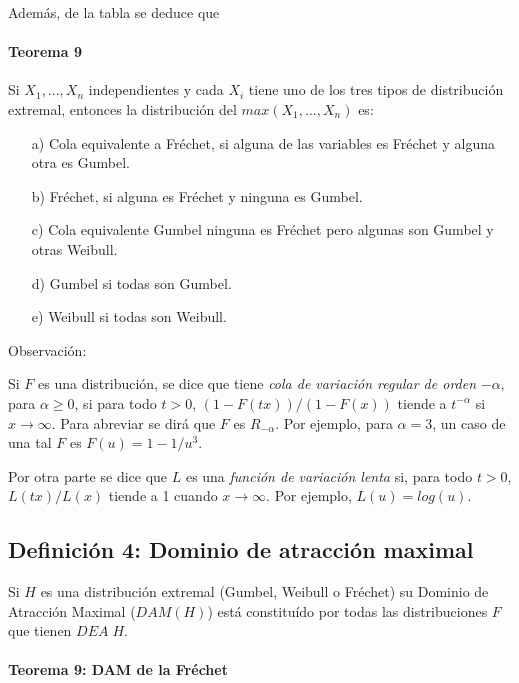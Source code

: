 \documentclass[
]{book}
\theoremstyle{definition}
\theoremstyle{definition}
\theoremstyle{definition}
\theoremstyle{definition}
\theoremstyle{remark}
\begin{document}
Además, de la tabla se deduce que

\paragraph{Teorema 9}\label{teorema-9}

Si \(X_1,...,X_n\) independientes y cada \(X_i\) tiene uno de los tres tipos de distribución extremal, entonces la distribución del \(max(X_1,...,X_n)\) es:

\begin{itemize}
\item[a)] Cola equivalente a Fréchet, si alguna de las variables es Fréchet y alguna otra es Gumbel.
\item[b)]  Fréchet, si alguna es Fréchet y ninguna es Gumbel.
\item[c)]  Cola equivalente Gumbel ninguna es Fréchet pero algunas son Gumbel y otras Weibull.
\item[d)] Gumbel si todas son Gumbel.
\item[e)]  Weibull si todas son Weibull.
\end{itemize}

Observación:

Si \(F\) es una distribución, se dice que tiene \textit{cola de variación regular de orden} \(-\alpha\), para \(\alpha \geq 0\), si para todo \(t>0\), \((1-F(tx))/(1-F(x))\) tiende
a \(t^{-\alpha}\) si \(x \rightarrow  \infty\). Para abreviar se dirá que \(F\) es \(R_{-\alpha}\). Por ejemplo, para \(\alpha=3\), un caso de una tal \(F\) es \(F(u)=1- 1/u^3\).

Por otra parte se dice que \(L\) es una \textit{función de variación lenta} si, para todo \(t>0\), \(L(tx)/L(x)\) tiende a 1 cuando \(x \rightarrow  \infty\). Por ejemplo, \(L(u)=log(u)\).

\newpage

\subsection{Definición 4: Dominio de atracción maximal}\label{definiciuxf3n-4-dominio-de-atracciuxf3n-maximal}

Si \(H\) es una distribución extremal (Gumbel, Weibull o Fréchet) su Dominio de Atracción Maximal (\(DAM(H)\)) está constituído por todas las distribuciones \(F\) que tienen \(DEA\;H\).

\paragraph{Teorema 9: DAM de la Fréchet}\label{teorema-9-dam-de-la-fruxe9chet}
\end{document}

